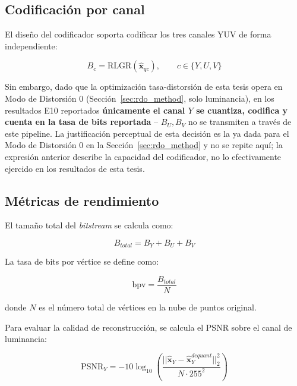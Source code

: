    \subsection{Codificación por canal}

   El diseño del codificador soporta codificar los tres canales YUV de forma independiente:

   \begin{equation}
       B_c = \text{RLGR}(\hat{\mathbf{x}}_{qc}), \qquad c \in \{Y, U, V\}
   \end{equation}

   Sin embargo, dado que la optimización tasa-distorsión de esta tesis opera en Modo de
   Distorsión 0 (Sección~\ref{sec:rdo_method}, solo luminancia), en los resultados E10
   reportados \textbf{únicamente el canal $Y$ se cuantiza, codifica y cuenta en la tasa de bits
   reportada} -- $B_U, B_V$ no se transmiten a través de este pipeline. La justificación perceptual de esta decisión es la ya dada para el Modo de Distorsión 0 en la Sección~\ref{sec:rdo_method} y no se repite aquí; la expresión anterior describe la capacidad del codificador, no lo efectivamente ejercido en los resultados de esta tesis.
   
   \subsection{Métricas de rendimiento}
   
   El tamaño total del \textit{bitstream} se calcula como:
   
   \begin{equation}
       B_{total} = B_Y + B_U + B_V
   \end{equation}
   
   La tasa de bits por vértice se define como:
   
   \begin{equation}
       \text{bpv} = \frac{B_{total}}{N}
   \end{equation}
   
   donde $N$ es el número total de vértices en la nube de puntos original.
   
   Para evaluar la calidad de reconstrucción, se calcula el PSNR sobre el canal de luminancia:
   
   \begin{equation}
       \text{PSNR}_Y = -10 \log_{10} \left( \frac{||\hat{\mathbf{x}}_Y - \hat{\mathbf{x}}_Y^{dequant}||_2^2}{N \cdot 255^2} \right)
   \end{equation}
   
